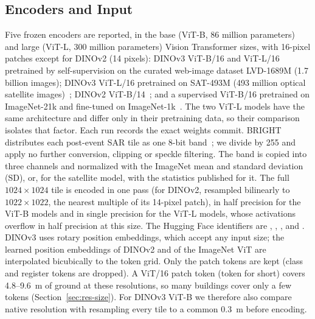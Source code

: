 \documentclass[journal]{IEEEtran}
\begin{document}
\subsection{Encoders and Input}
{\sloppy Five frozen encoders are reported, in the base (ViT-B, 86 million parameters) and large (ViT-L, 300 million parameters) Vision Transformer sizes, with 16-pixel patches except for DINOv2 (14 pixels): DINOv3 ViT-B/16 and ViT-L/16 pretrained by self-supervision on the curated web-image dataset LVD-1689M (1.7 billion images); DINOv3 ViT-L/16 pretrained on SAT-493M (493 million optical satellite images)~\cite{simeoni2026dinov3}; DINOv2 ViT-B/14~\cite{oquab2024dinov2}; and a supervised ViT-B/16 pretrained on ImageNet-21k and fine-tuned on ImageNet-1k~\cite{dosovitskiy2021vit}. The two ViT-L models have the same architecture and differ only in their pretraining data, so their comparison isolates that factor. Each run records the exact weights commit. BRIGHT distributes each post-event SAR tile as one 8-bit band~\cite{chen2025bright}; we divide by 255 and apply no further conversion, clipping or speckle filtering. The band is copied into three channels and normalized with the ImageNet mean and standard deviation (SD), or, for the satellite model, with the statistics published for it. The full $1024\times1024$ tile is encoded in one pass (for DINOv2, resampled bilinearly to $1022\times1022$, the nearest multiple of its 14-pixel patch), in half precision for the ViT-B models and in single precision for the ViT-L models, whose activations overflow in half precision at this size. The Hugging Face identifiers are , , ,  and . DINOv3 uses rotary position embeddings, which accept any input size; the learned position embeddings of DINOv2 and of the ImageNet ViT are interpolated bicubically to the token grid. Only the patch tokens are kept (class and register tokens are dropped). A ViT/16 patch token (token for short) covers 4.8--9.6~m of ground at these resolutions, so many buildings cover only a few tokens (Section~\ref{sec:res-size}). For DINOv3 ViT-B we therefore also compare native resolution with resampling every tile to a common 0.3~m before encoding.\par}
\end{document}
